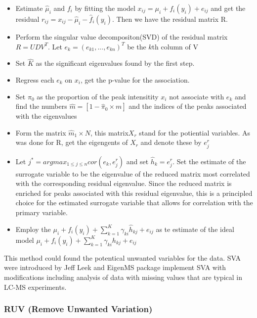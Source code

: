 \documentclass[
]{book}
\begin{document}
\begin{itemize}
\item
  Estimate \(\hat\mu_i\) and \(f_i\) by fitting the model \(x_{ij} = \mu_i + f_i(y_i) + e_{ij}\) and get the residual \(r_{ij} = x_{ij}-\hat\mu_i - \hat f_i(y_i)\). Then we have the residual matrix R.
\item
  Perform the singular value decompositon(SVD) of the residual matrix \(R = UDV^T\). Let \(e_k = (e_{k1},...,e_{kn})^T\) be the \(k\)th column of V
\item
  Set \(\hat K\) as the significant eigenvalues found by the first step.
\item
  Regress each \(e_k\) on \(x_i\), get the p-value for the association.
\item
  Set \(\pi_0\) as the proportion of the peak intensitity \(x_i\) not associate with \(e_k\) and find the numbers \(\hat m =[1-\hat \pi_0 \times m]\) and the indices of the peaks associated with the eigenvalues
\item
  Form the matrix \(\hat m_1 \times N\), this matrix\(X_r\) stand for the potiential variables. As was done for R, get the eigengents of \(X_r\) and denote these by \(e_j^r\)
\item
  Let \(j^* = argmax_{1\leq j \leq n}cor(e_k,e_j^r)\) and set \(\hat h_k=e_j^r\). Set the estimate of the surrogate variable to be the eigenvalue of the reduced matrix most correlated with the corresponding residual eigenvalue. Since the reduced matrix is enriched for peaks associated with this residual eigenvalue, this is a principled choice for the estimated surrogate variable that allows for correlation with the primary variable.
\item
  Employ the \(\mu_i + f_i(y_i) + \sum_{k = 1}^K \gamma_{ki}\hat h_{kj} + e_{ij}\) as te estimate of the ideal model \(\mu_i + f_i(y_i) + \sum_{k = 1}^K \gamma_{ki}h_{kj} + e_{ij}\)
\end{itemize}

This method could found the potentical unwanted variables for the data. SVA were introduced by Jeff Leek\citep{leek2012, leek2007, leek2008} and EigenMS package implement SVA with modifications including analysis of data with missing values that are typical in LC-MS experiments\citep{karpievitch2014a}.

\hypertarget{ruv-remove-unwanted-variation}{%
\subsubsection{RUV (Remove Unwanted Variation)}\label{ruv-remove-unwanted-variation}}
\end{document}
